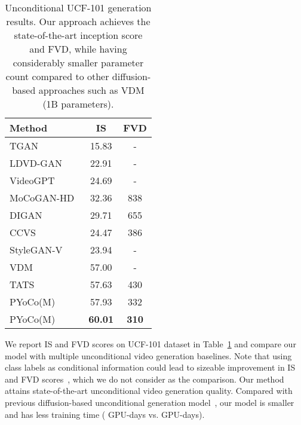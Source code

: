 \documentclass[10pt,twocolumn,letterpaper]{article}
\newcommand{\ediffivideo}{PYoCo\xspace}
\newcommand{\tabcspace}{\vspace{-2mm}}
\newcommand{\tabspace}{\vspace{-4mm}}
\begin{document}
\begin{table}[t]
\centering
\caption{Unconditional UCF-101 generation results. Our approach achieves the state-of-the-art inception score and FVD, while having considerably smaller parameter count compared to other diffusion-based approaches such as VDM (1B parameters).}
\tabcspace
\label{tab:main_small_scale}
\begin{tabular}{lcc}
\toprule
Method & IS   & FVD    \\
\midrule
TGAN~\cite{saito2017temporal} & 15.83\tiny{} & -  \\
LDVD-GAN~\cite{kahembwe2020lower} & 22.91\tiny{}   & - \\
VideoGPT~\cite{yan2021videogpt} & 24.69\tiny{}   & - \\
MoCoGAN-HD~\cite{tian2021a}  & 32.36\phantom{\tiny{}} & 838 \\
DIGAN~\cite{yu2021generating} & 29.71\tiny{}   & 655\tiny{}   \\
CCVS~\cite{le2021ccvs}  & 24.47\tiny{} & 386\tiny{} \\
StyleGAN-V~\cite{skorokhodov2021stylegan}  & 23.94\tiny{} & - \\
VDM~\cite{ho2022video}  & 57.00\tiny{} & - \\
TATS~\cite{ge2022long}  & 57.63\tiny{} & 430 \tiny{} \\
\rowcolor[HTML]{DFDFDF} 
\ediffivideo (M) & 57.93\tiny{} & 332 \tiny{} \\
\rowcolor[HTML]{DFDFDF} 
\ediffivideo (M) & \textbf{60.01}\tiny{} & \textbf{310} \tiny{} \\
\bottomrule
\end{tabular}
\tabspace
\end{table}


%
 We report IS and FVD scores on UCF-101 dataset in Table~\ref{tab:main_small_scale} and compare our model with multiple unconditional video generation baselines. Note that using class labels as conditional information could lead to sizeable improvement in IS and FVD scores~\cite{ge2022long}, which we do not consider as the comparison. Our method attains state-of-the-art unconditional video generation quality. Compared with previous diffusion-based unconditional generation model~\cite{ho2022video}, our model is  smaller and has  less training time ( GPU-days vs.  GPU-days). 
\end{document}
